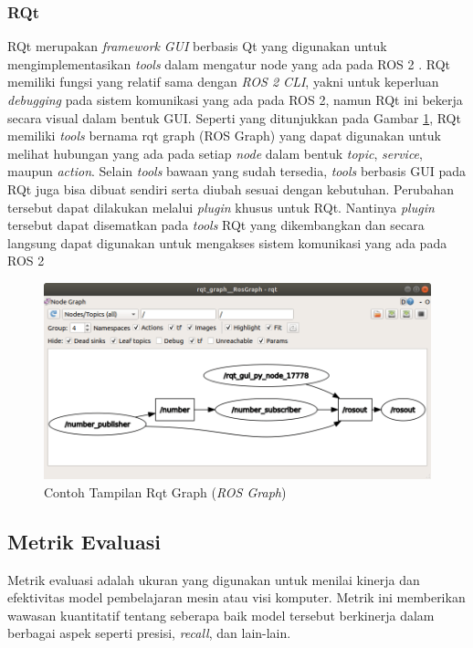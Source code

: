 \subsubsection{RQt}
\label{subsubsec:rqt}

RQt merupakan \textit{framework} \textit{GUI} berbasis Qt yang digunakan untuk mengimplementasikan \textit{tools} dalam mengatur node yang
ada pada ROS 2 \parencite{url:rqt}. RQt memiliki fungsi yang relatif sama dengan \textit{ROS 2 CLI}, yakni untuk keperluan \textit{debugging} pada sistem
komunikasi yang ada pada ROS 2, namun RQt ini bekerja secara visual dalam bentuk GUI. Seperti yang ditunjukkan pada Gambar \ref{fig:rqtgraph}, RQt memiliki \textit{tools} bernama rqt graph (ROS Graph) yang dapat digunakan untuk melihat hubungan yang ada pada
setiap \textit{node} dalam bentuk \textit{topic}, \textit{service}, maupun \textit{action}. Selain \textit{tools} bawaan yang sudah tersedia, \textit{tools} berbasis GUI
pada RQt juga bisa dibuat sendiri serta diubah sesuai dengan kebutuhan. Perubahan tersebut dapat dilakukan melalui \textit{plugin} khusus untuk RQt. Nantinya
\textit{plugin} tersebut dapat disematkan pada \textit{tools} RQt yang dikembangkan dan secara langsung dapat digunakan untuk mengakses sistem komunikasi yang ada pada ROS 2
\begin{figure}[ht]
  \centering
  \includegraphics[scale=0.45]{gambar/rqt_graph.png}
  \caption{Contoh Tampilan Rqt Graph (\textit{ROS Graph})}
  \label{fig:rqtgraph}
\end{figure}


\subsection{ Metrik Evaluasi}
\label{subsec:evaluation-metrics}

Metrik evaluasi adalah ukuran yang digunakan untuk menilai kinerja dan efektivitas model pembelajaran mesin atau visi komputer. Metrik ini memberikan wawasan kuantitatif tentang seberapa baik model tersebut berkinerja dalam berbagai aspek seperti presisi, \textit{recall}, dan lain-lain.

